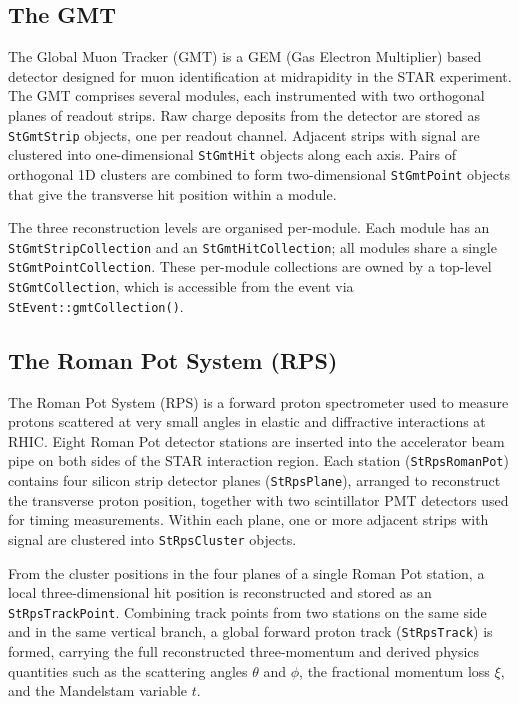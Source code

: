\documentclass[twoside]{article}
\begin{document}
\subsection{The GMT}
The Global Muon Tracker (GMT) is a GEM (Gas Electron Multiplier) based detector
designed for muon identification at midrapidity in the STAR experiment.
The GMT comprises several modules, each instrumented with two orthogonal planes
of readout strips.  Raw charge deposits from the detector are stored as
\texttt{StGmtStrip} objects, one per readout channel.  Adjacent strips with
signal are clustered into one-dimensional \texttt{StGmtHit} objects along each
axis.  Pairs of orthogonal 1D clusters are combined to form two-dimensional
\texttt{StGmtPoint} objects that give the transverse hit position within a module.

The three reconstruction levels are organised per-module.  Each module has an
\texttt{StGmtStripCollection} and an \texttt{StGmtHitCollection}; all modules
share a single \texttt{StGmtPointCollection}.  These per-module collections are
owned by a top-level \texttt{StGmtCollection}, which is accessible from the
event via \texttt{StEvent::gmtCollection()}.

\subsection{The Roman Pot System (RPS)}
The Roman Pot System (RPS) is a forward proton spectrometer used to measure
protons scattered at very small angles in elastic and diffractive interactions
at RHIC.  Eight Roman Pot detector stations are inserted into the accelerator
beam pipe on both sides of the STAR interaction region.  Each station
(\texttt{StRpsRomanPot}) contains four silicon strip detector planes
(\texttt{StRpsPlane}), arranged to reconstruct the transverse proton position,
together with two scintillator PMT detectors used for timing measurements.
Within each plane, one or more adjacent strips with signal are clustered into
\texttt{StRpsCluster} objects.

From the cluster positions in the four planes of a single Roman Pot station,
a local three-dimensional hit position is reconstructed and stored as an
\texttt{StRpsTrackPoint}.  Combining track points from two stations on the same
side and in the same vertical branch, a global forward proton track
(\texttt{StRpsTrack}) is formed, carrying the full reconstructed three-momentum
and derived physics quantities such as the scattering angles $\theta$ and
$\phi$, the fractional momentum loss $\xi$, and the Mandelstam variable $t$.
\end{document}
